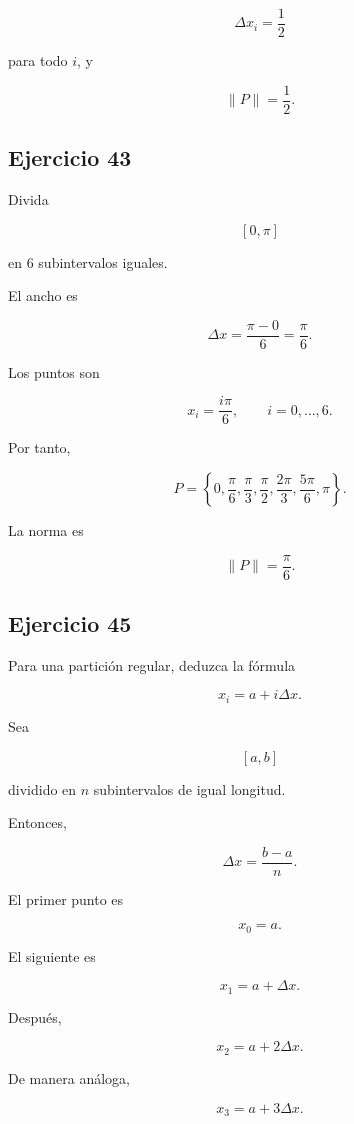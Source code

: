 \documentclass[12pt]{article}
\begin{document}
\[
\boxed{
\Delta x_i=\frac12
}
\]

para todo \(i\), y

\[
\boxed{
\|P\|=\frac12
}.
\]

\subsection*{Ejercicio 43}

Divida

\[
[0,\pi]
\]

en \(6\) subintervalos iguales.

El ancho es

\[
\Delta x
=
\frac{\pi-0}{6}
=
\frac{\pi}{6}.
\]

Los puntos son

\[
x_i=
\frac{i\pi}{6},
\qquad
i=0,\ldots,6.
\]

Por tanto,

\[
P=
\left\{
0,
\frac{\pi}{6},
\frac{\pi}{3},
\frac{\pi}{2},
\frac{2\pi}{3},
\frac{5\pi}{6},
\pi
\right\}.
\]

La norma es

\[
\boxed{
\|P\|=\frac{\pi}{6}
}.
\]

\subsection*{Ejercicio 45}

Para una partición regular, deduzca la fórmula

\[
x_i=a+i\Delta x.
\]

Sea

\[
[a,b]
\]

dividido en \(n\) subintervalos de igual longitud.

Entonces,

\[
\Delta x=
\frac{b-a}{n}.
\]

El primer punto es

\[
x_0=a.
\]

El siguiente es

\[
x_1=a+\Delta x.
\]

Después,

\[
x_2=a+2\Delta x.
\]

De manera análoga,

\[
x_3=a+3\Delta x.
\]
\end{document}
